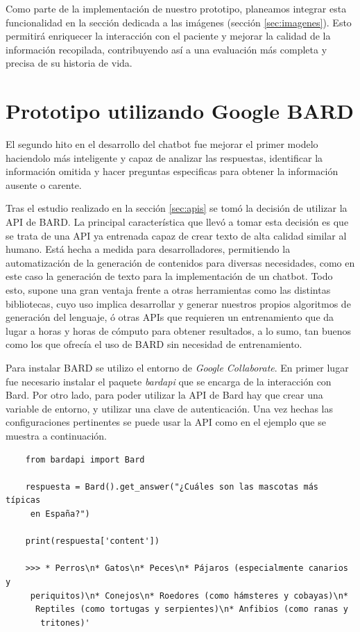Como parte de la implementación de nuestro prototipo, planeamos integrar esta funcionalidad en la sección dedicada a las imágenes (sección \ref{sec:imagenes}). Esto permitirá enriquecer la interacción con el paciente y mejorar la calidad de la información recopilada, contribuyendo así a una evaluación más completa y precisa de su historia de vida. 

\section{Prototipo utilizando Google BARD}
\label{sec:prototipoBARD}
El segundo hito en el desarrollo del chatbot fue mejorar el primer modelo haciendolo más inteligente y capaz de analizar las respuestas, identificar la información omitida y hacer preguntas especificas para obtener la información ausente o carente. 

Tras el estudio realizado en la sección \ref{sec:apis} se tomó la decisión de utilizar la API de BARD. La principal característica que llevó a tomar esta decisión es que se trata de una API ya entrenada capaz de crear texto de alta calidad similar al humano. Está hecha a medida para desarrolladores, permitiendo la automatización de la generación de contenidos para diversas necesidades, como en este caso la generación de texto para la implementación de un chatbot. Todo esto, supone una gran ventaja frente a otras herramientas como las distintas bibliotecas, cuyo uso implica desarrollar y generar nuestros propios algoritmos de generación del lenguaje, ó otras APIs que requieren un entrenamiento que da lugar a horas y horas de cómputo para obtener resultados, a lo sumo, tan buenos como los que ofrecía el uso de BARD sin necesidad de entrenamiento. 

Para instalar BARD se utilizo el entorno de \textit{Google Collaborate}. En primer lugar fue necesario instalar el paquete \textit{bardapi} que se encarga de la interacción con Bard. Por otro lado, para poder utilizar la API de Bard hay que crear una variable de entorno, y utilizar una clave de autenticación. Una vez hechas las configuraciones pertinentes se puede usar la API como en el ejemplo que se muestra a continuación. 

\begin{verbatim}
	from bardapi import Bard
	
	respuesta = Bard().get_answer("¿Cuáles son las mascotas más típicas
	 en España?")
	
	print(respuesta['content'])
	
	>>> * Perros\n* Gatos\n* Peces\n* Pájaros (especialmente canarios y
	 periquitos)\n* Conejos\n* Roedores (como hámsteres y cobayas)\n*
	  Reptiles (como tortugas y serpientes)\n* Anfibios (como ranas y
	   tritones)'
\end{verbatim}

